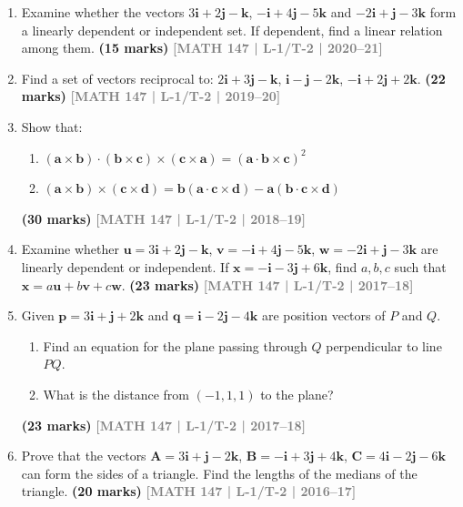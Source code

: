 \documentclass[12pt,a4paper]{article}
\newcommand{\yr}[1]{\hfill\textcolor{gray}{\small\textbf{[#1]}}}
\newcommand{\mk}[1]{\textcolor{orange!70!black}{\small\textbf{(#1 marks)}}}
\begin{document}
\begin{enumerate}
  
  \item Examine whether the vectors $3\mathbf{i}+2\mathbf{j}-\mathbf{k}$, $-\mathbf{i}+4\mathbf{j}-5\mathbf{k}$ and $-2\mathbf{i}+\mathbf{j}-3\mathbf{k}$ form a linearly dependent or independent set. If dependent, find a linear relation among them.
\mk{15} \yr{MATH 147 | L-1/T-2 | 2020--21}

\item Find a set of vectors reciprocal to: $2\mathbf{i}+3\mathbf{j}-\mathbf{k}$, $\mathbf{i}-\mathbf{j}-2\mathbf{k}$, $-\mathbf{i}+2\mathbf{j}+2\mathbf{k}$.
\mk{22} \yr{MATH 147 | L-1/T-2 | 2019--20}

\item Show that:
\begin{enumerate}
  \item $(\mathbf{a}\times\mathbf{b})\cdot(\mathbf{b}\times\mathbf{c})\times(\mathbf{c}\times\mathbf{a})=(\mathbf{a}\cdot\mathbf{b}\times\mathbf{c})^{2}$
  \item $(\mathbf{a}\times\mathbf{b})\times(\mathbf{c}\times\mathbf{d})=\mathbf{b}(\mathbf{a}\cdot\mathbf{c}\times\mathbf{d})-\mathbf{a}(\mathbf{b}\cdot\mathbf{c}\times\mathbf{d})$
\end{enumerate}
\mk{30} \yr{MATH 147 | L-1/T-2 | 2018--19}

\item Examine whether $\mathbf{u}=3\mathbf{i}+2\mathbf{j}-\mathbf{k}$, $\mathbf{v}=-\mathbf{i}+4\mathbf{j}-5\mathbf{k}$, $\mathbf{w}=-2\mathbf{i}+\mathbf{j}-3\mathbf{k}$ are linearly dependent or independent. If $\mathbf{x}=-\mathbf{i}-3\mathbf{j}+6\mathbf{k}$, find $a,b,c$ such that $\mathbf{x}=a\mathbf{u}+b\mathbf{v}+c\mathbf{w}$.
\mk{23} \yr{MATH 147 | L-1/T-2 | 2017--18}

\item Given $\mathbf{p}=3\mathbf{i}+\mathbf{j}+2\mathbf{k}$ and $\mathbf{q}=\mathbf{i}-2\mathbf{j}-4\mathbf{k}$ are position vectors of $P$ and $Q$.
\begin{enumerate}
  \item Find an equation for the plane passing through $Q$ perpendicular to line $PQ$.
  \item What is the distance from $(-1,1,1)$ to the plane?
\end{enumerate}
\mk{23} \yr{MATH 147 | L-1/T-2 | 2017--18}

\item Prove that the vectors $\mathbf{A}=3\mathbf{i}+\mathbf{j}-2\mathbf{k}$, $\mathbf{B}=-\mathbf{i}+3\mathbf{j}+4\mathbf{k}$, $\mathbf{C}=4\mathbf{i}-2\mathbf{j}-6\mathbf{k}$ can form the sides of a triangle. Find the lengths of the medians of the triangle.
\mk{20} \yr{MATH 147 | L-1/T-2 | 2016--17}


\end{enumerate}
\end{document}
